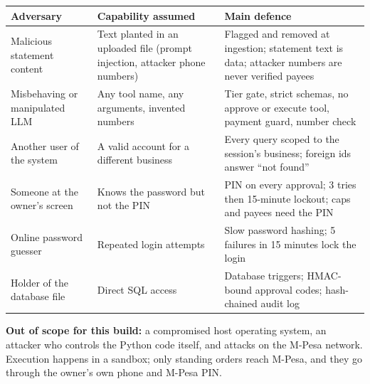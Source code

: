 \documentclass[10pt,a4paper]{article}
\begin{document}
\begin{center}
\begin{tabularx}{\textwidth}{@{}>{\raggedright\arraybackslash}p{3.4cm}>{\raggedright\arraybackslash}p{4.6cm}Y@{}}
\toprule
\textbf{Adversary} & \textbf{Capability assumed} & \textbf{Main defence}\\
\midrule
Malicious statement content & Text planted in an uploaded file (prompt injection, attacker phone numbers) & Flagged and removed at ingestion; statement text is data; attacker numbers are never verified payees\\
Misbehaving or manipulated LLM & Any tool name, any arguments, invented numbers & Tier gate, strict schemas, no approve or execute tool, payment guard, number check\\
Another user of the system & A valid account for a different business & Every query scoped to the session's business; foreign ids answer ``not found''\\
Someone at the owner's screen & Knows the password but not the PIN & PIN on every approval; 3 tries then 15-minute lockout; caps and payees need the PIN\\
Online password guesser & Repeated login attempts & Slow password hashing; 5 failures in 15 minutes lock the login\\
Holder of the database file & Direct SQL access & Database triggers; HMAC-bound approval codes; hash-chained audit log\\
\bottomrule
\end{tabularx}
\end{center}
\textbf{Out of scope for this build:} a compromised host operating system, an attacker who controls the Python code itself, and attacks on the M-Pesa network. Execution happens in a sandbox; only standing orders reach M-Pesa, and they go through the owner's own phone and M-Pesa PIN.
\end{document}
